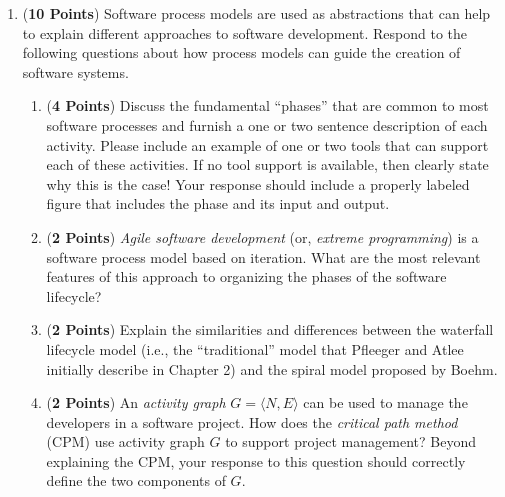 \documentclass[12pt,epsf,psfig,graphics]{article}
\begin{document}
\begin{enumerate}
\newpage

\item ({\bf 10 Points}) Software process models are used as
  abstractions that can help to explain different approaches to
  software development. Respond to the following questions about how
  process models can guide the creation of software systems.

        \begin{enumerate}
          
        \item ({\bf 4 Points}) Discuss the fundamental ``phases'' that
          are common to most software processes and furnish a one or
          two sentence description of each activity.  Please include
          an example of one or two tools that can support each of
          these activities. If no tool support is available, then
          clearly state why this is the case!  Your response should
          include a properly labeled figure that includes the phase
          and its input and output.
          

        \item ({\bf 2 Points}) {\em Agile software development} (or,
          {\em extreme programming}) is a software process model based
          on iteration.  What are the most relevant features of this
          approach to organizing the phases of the software lifecycle?

        \item ({\bf 2 Points}) Explain the similarities and
          differences between the waterfall lifecycle model (i.e., the
          ``traditional'' model that Pfleeger and Atlee initially
          describe in Chapter 2) and the spiral model proposed by
          Boehm.

        \item ({\bf 2 Points}) An {\em activity graph} $G = \langle N,
          E \rangle$ can be used to manage the developers in a
          software project.  How does the {\em critical path method}
          (CPM) use activity graph $G$ to support project management?
          Beyond explaining the CPM, your response to this question
          should correctly define the two components of $G$.


\end{enumerate}
\end{enumerate}
\end{document}
